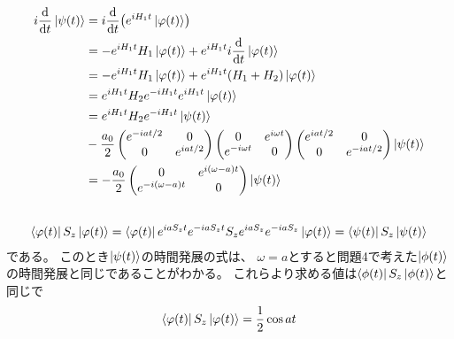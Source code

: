 \documentclass[../../master.tex]{subfiles}
\begin{document}
\subsection{}
\begin{align}
    i\dv{t}\ket{\psi(t)}
    &= i\dv{t}\qty(e^{iH_1t}\ket{\varphi(t)})\\
    &=-e^{iH_1 t}H_1\ket{\varphi(t)}+e^{iH_1t}i\dv{t}\ket{\varphi(t)}\\
    &=-e^{iH_1 t}H_1\ket{\varphi(t)}+e^{iH_1t}(H_1+H_2)\ket{\varphi(t)}\\
    &=e^{iH_1t}H_2e^{-iH_1t} e^{iH_1 t}\ket{\varphi(t)}\\
    &=e^{iH_1t}H_2e^{-iH_1t}\ket{\psi(t)}\\
    &-\frac{a_0}{2}\begin{pmatrix}
        e^{-iat/2} &0\\
        0 & e^{iat/2}
    \end{pmatrix}\begin{pmatrix}
        0 & e^{i\omega t}\\
        e^{-i\omega t}& 0
    \end{pmatrix}\begin{pmatrix}
        e^{iat/2} & 0\\
        0 & e^{-iat/2}
    \end{pmatrix}\ket{\psi(t)}\\
    &= -\frac{a_0}{2}\begin{pmatrix}
        0 & e^{i(\omega -a)t}\\
        e^{-i(\omega - a)t} &0
    \end{pmatrix}\ket{\psi(t)}
\end{align}

\subsection{}
\begin{align}
    \bra{\varphi(t)}S_z\ket{\varphi(t)}
    = \bra{\varphi(t)}e^{iaS_z t}e^{-iaS_zt}S_ze^{iaS_z}e^{-iaS_z}\ket{\varphi(t)}
    = \bra{\psi(t)}S_z\ket{\psi(t)}
\end{align}
である。
このとき\(\ket{\psi(t)}\)の時間発展の式は、
\(\omega=a\)とすると問題4で考えた\(\ket{\phi(t)}\)の時間発展と同じであることがわかる。
これらより求める値は\(\bra{\phi(t)}S_z\ket{\phi(t)}\)と同じで
\begin{align}
    \bra{\varphi(t)}S_z\ket{\varphi(t)}  = \frac{1}{2}\cos at
\end{align}
\end{document}
